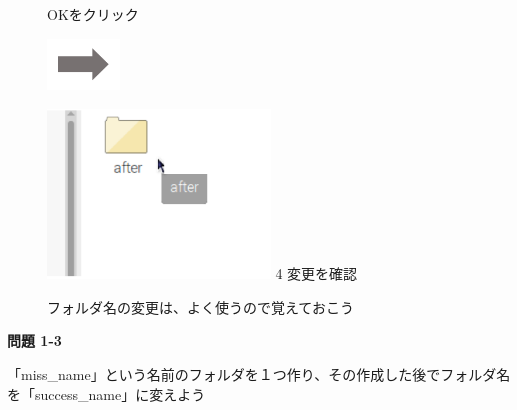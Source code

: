 \documentclass[a4paper,12pt]{jarticle}
\begin{document}
\begin{figure}[ht]
\begin{minipage}{6.973cm}
    OKをクリック
  \end{minipage}
  \includegraphics[width=1.919cm,height=1.365cm]{textbook-img053.png}
  \begin{minipage}{5.751cm}
    \includegraphics[width=5.92cm,height=4.51cm]{textbook-img056.png}
    4 変更を確認
  \end{minipage}
  \centering

  \begin{minipage}{5.751cm}
    フォルダ名の変更は、よく使うので覚えておこう
  \end{minipage}
\end{figure}


{\bfseries
問題 1-3}

「miss\_name」という名前のフォルダを１つ作り、その作成した後でフォルダ名を「success\_name」に変えよう
\end{document}
